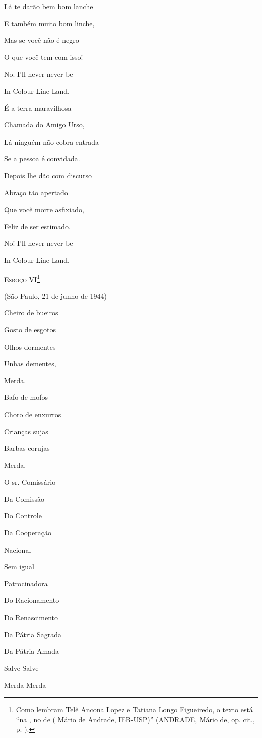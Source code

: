 Lá te darão bem bom lanche

E também muito bom linche,

Mas se você não é negro

O que você tem com isso!

No. I'll never never be

In Colour Line Land.

É a terra maravilhosa

Chamada do Amigo Urso,

Lá ninguém não cobra entrada

Se a pessoa é convidada.

Depois lhe dão com discurso

Abraço tão apertado

Que você morre asfixiado,

Feliz de ser estimado.

No! I'll never never be

In Colour Line Land.

\textsc{Esboço VI}\footnote{Como lembram Telê Ancona Lopez e Tatiana
  Longo Figueiredo, o texto está ``na , no de ( Mário de Andrade,
  IEB-USP)'' (ANDRADE, Mário de, op. cit., p. ).}

(São Paulo, 21 de junho de 1944)

Cheiro de bueiros

Gosto de esgotos

Olhos dormentes

Unhas dementes,

Merda.

Bafo de mofos

Choro de enxurros

Crianças sujas

Barbas corujas

Merda.

O sr. Comissário

Da Comissão

Do Controle

Da Cooperação

Nacional

Sem igual

Patrocinadora

Do Racionamento

Do Renascimento

Da Pátria Sagrada

Da Pátria Amada

Salve Salve

Merda Merda

